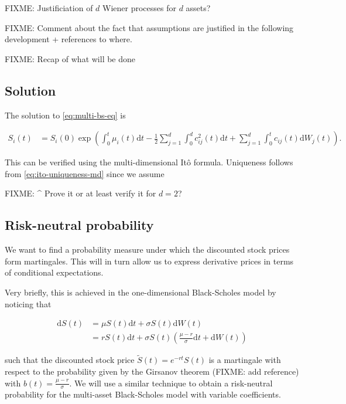 \documentclass[a4paper]{article}
\begin{document}
FIXME: Justificiation of $d$ Wiener processes for $d$ assets?

FIXME: Comment about the fact that assumptions are justified in the following development + references to where.

FIXME: Recap of what will be done

\subsection{Solution}

The solution to \eqref{eq:multi-bs-eq} is

\begin{align*}
  S_i(t) &= S_i(0) \exp \left( \int_0^t \mu_i(t) \mathrm{d}t - \frac{1}{2} \sum_{j=1}^{d} \int_0^d c_{ij}^2(t) \mathrm{d}t + \sum_{j=1}^d \int_0^t c_{ij}(t) \mathrm{d}W_j(t) \right).
\end{align*}

This can be verified using the multi-dimensional It\^o formula. Uniqueness follows from \eqref{eq:ito-uniqueness-md} since we assume

FIXME: \^{} Prove it or at least verify it for $d=2$?

\pagebreak
\subsection{Risk-neutral probability}

We want to find a probability measure under which the discounted stock prices form martingales. This will in turn allow us to express derivative prices in terms of conditional expectations.

Very briefly, this is achieved in the one-dimensional Black-Scholes model by noticing that

\begin{align*}
  \mathrm{d}S(t)
  &= \mu S(t) \mathrm{d}t + \sigma S(t) \mathrm{d}W(t)\\
  &= r S(t) \mathrm{d}t + \sigma S(t) \left(\frac{\mu - r}{\sigma} \mathrm{d}t + \mathrm{d}W(t)\right)
\end{align*}

such that the discounted stock price $\tilde{S}(t) = e^{-rt}S(t)$ is a martingale with respect to the probability given by the Girsanov theorem (FIXME: add reference) with $b(t) = \frac{\mu - r}{\sigma}$. We will use a similar technique to obtain a risk-neutral probability for the multi-asset Black-Scholes model with variable coefficients.
\end{document}
